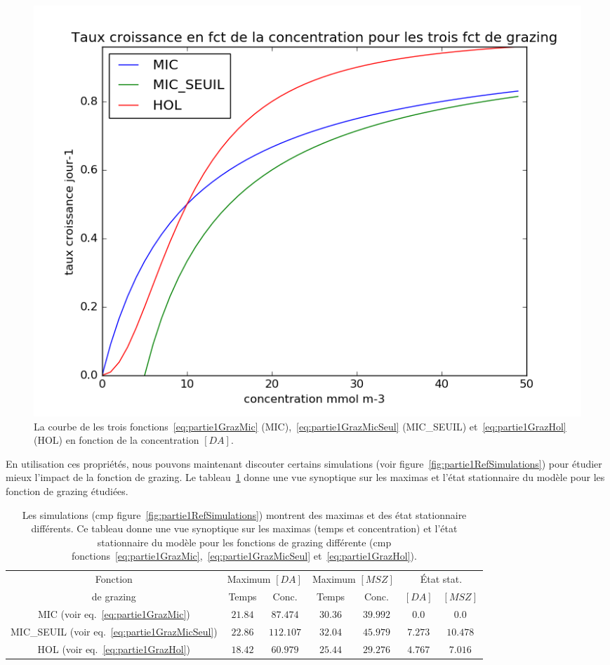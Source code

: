 {\begin{figure}[h!]
  \includegraphics[width=\textwidth]{partie1/grazingFct.png}
  \caption{
La courbe de les trois fonctions~\ref{eq:partie1GrazMic} (MIC),~\ref{eq:partie1GrazMicSeul} (MIC\_SEUIL)
et~\ref{eq:partie1GrazHol} (HOL) en fonction de la concentration $[DA]$.
}
  \label{fig:partie1grazingFcts}
\end{figure}

\par{
En utilisation ces propriétés, nous pouvons maintenant discouter certains simulations (voir
figure~\ref{fig:partie1RefSimulations}) pour étudier mieux l'impact de la fonction de grazing.
Le tableau~\ref{tab:partie1appPropFctGrazing} donne une vue synoptique sur les maximas et l'état
stationnaire du modèle pour les fonction de grazing étudiées.
}

\begin{table}[h!]
\begin{center}
\begin{tabular}{ | c | c c | c c | c c |}
\hline
Fonction & \multicolumn{2}{c|}{Maximum $[DA]$} & \multicolumn{2}{c|}{Maximum $[MSZ]$} &
\multicolumn{2}{c|}{État stat.} \\
de grazing & Temps & Conc. & Temps & Conc. & $[DA]$ & $[MSZ]$ \\
\hline
MIC (voir eq.~\ref{eq:partie1GrazMic}) & $21.84$ & $87.474$ & $30.36$ & $39.992$ & $0.0$ & $0.0$ \\
MIC\_SEUIL (voir eq.~\ref{eq:partie1GrazMicSeul}) & $22.86$ & $112.107$ & $32.04$ & $45.979$ & $7.273$ & $10.478$ \\
HOL (voir eq.~\ref{eq:partie1GrazHol}) & $18.42$ & $60.979$ & $25.44$ & $29.276$ & $4.767$ & $7.016$ \\
\hline
\end{tabular}
\end{center}
  \caption{Les simulations (cmp figure~\ref{fig:partie1RefSimulations}) montrent des maximas et
des état stationnaire différents. Ce tableau donne une vue synoptique sur les maximas
(temps et concentration) et l'état stationnaire du modèle pour les fonctions de grazing différente
(cmp fonctions~\ref{eq:partie1GrazMic},~\ref{eq:partie1GrazMicSeul} et~\ref{eq:partie1GrazHol}).}
  \label{tab:partie1appPropFctGrazing}
\end{table}

}
